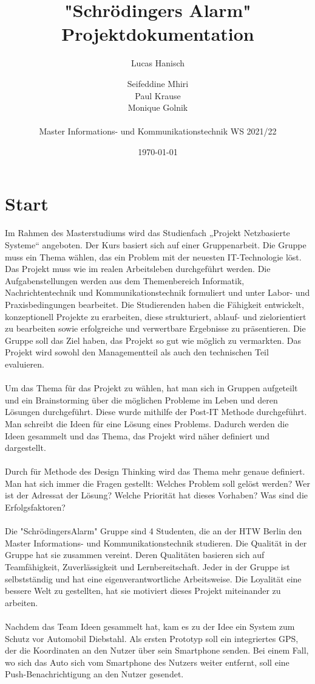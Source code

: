 \documentclass[11pt,a4paper,ngerman]{report}
\date{\today}
\title{"Schrödingers Alarm"\\ Projektdokumentation}
\author{Lucas Hanisch \and Seifeddine Mhiri \\ Paul Krause  \\  Monique Golnik \\ \\Master Informations- und Kommunikationstechnik WS 2021/22}
\begin{document}
	\maketitle
	\tableofcontents
	
	\chapter{Start}
	
Im Rahmen des Masterstudiums wird das Studienfach „Projekt Netzbasierte Systeme“ angeboten. Der Kurs basiert sich auf einer Gruppenarbeit.
Die Gruppe muss ein Thema wählen, das ein Problem mit der neuesten IT-Technologie löst. Das Projekt muss wie im realen Arbeitsleben durchgeführt werden. Die Aufgabenstellungen werden aus dem Themenbereich Informatik, Nachrichtentechnik und Kommunikationstechnik formuliert und unter Labor- und
Praxisbedingungen bearbeitet. Die Studierenden haben die Fähigkeit entwickelt, konzeptionell Projekte zu erarbeiten, diese strukturiert, ablauf- und zielorientiert zu
bearbeiten sowie erfolgreiche und verwertbare Ergebnisse zu präsentieren.
Die Gruppe soll das Ziel haben, das Projekt so gut wie möglich zu vermarkten.
Das Projekt wird sowohl den Managementteil als auch den technischen Teil evaluieren.\\\\
Um das Thema für das Projekt zu wählen, hat man sich in Gruppen aufgeteilt und ein Brainstorming über die möglichen Probleme im Leben und deren Lösungen durchgeführt. 
Diese wurde mithilfe der Post-IT Methode durchgeführt. Man schreibt die Ideen für eine Lösung eines Problems.
Dadurch werden die Ideen gesammelt und das Thema, das Projekt wird näher definiert und  dargestellt. \\\\
Durch für Methode des Design Thinking wird das Thema mehr genaue definiert. Man hat sich immer die Fragen gestellt: Welches Problem soll gelöst werden? Wer ist der Adressat der Lösung? Welche Priorität hat dieses Vorhaben? Was sind die Erfolgsfaktoren? \\\\
Die "SchrödingersAlarm" Gruppe sind 4 Studenten, die an der HTW Berlin den Master Informations- und Kommunikationstechnik studieren. Die Qualität in der Gruppe hat sie zusammen vereint. Deren Qualitäten basieren sich auf Teamfähigkeit, Zuverlässigkeit und Lernbereitschaft. Jeder in der Gruppe ist selbstständig und hat eine eigenverantwortliche Arbeitsweise. Die Loyalität eine bessere Welt zu gestellten, hat sie motiviert dieses Projekt miteinander zu arbeiten.\\\\
Nachdem das Team Ideen gesammelt hat, kam es zu der Idee ein System zum Schutz vor Automobil Diebstahl. 
Als ersten Prototyp soll ein integriertes GPS, der die Koordinaten an den Nutzer über sein Smartphone senden. 
Bei einem Fall, wo sich das Auto sich vom Smartphone des Nutzers weiter entfernt, soll eine Push-Benachrichtigung an den Nutzer gesendet.
	
\end{document}
